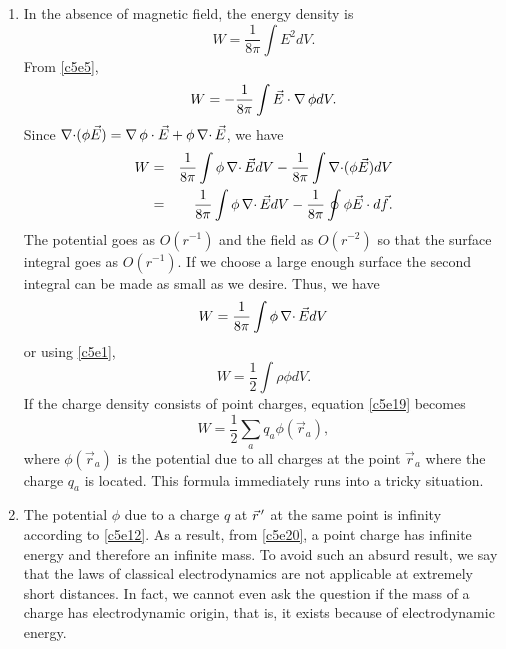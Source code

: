 \begin{enumerate}
\item In the absence of magnetic field, the energy density is
\begin{equation}\label{c5e18}
W = \frac{1}{8\pi}\int E^2dV.
\end{equation}
From \eqref{c5e5},
\[
W = -\frac{1}{8\pi}\int\vec{E}\cdot\operatorname{\nabla}\phi dV.
\]
Since $\operatorname{\nabla\cdot}(\phi\vec{E}) = \operatorname{\nabla}\phi\cdot\vec{E} + \phi\operatorname{\nabla\cdot}\vec{E}$, we have
\begin{eqnarray*}
W &=& 
\frac{1}{8\pi}\int\phi\operatorname{\nabla\cdot}\vec{E}dV - \frac{1}{8\pi}\int\operatorname{\nabla\cdot}(\phi\vec{E})dV \\
 &=& \frac{1}{8\pi}\int\phi\operatorname{\nabla\cdot}\vec{E}dV - 
 \frac{1}{8\pi}\oint \phi\vec{E}\cdot d\vec{f}.
\end{eqnarray*}
The potential goes as $O(r^{-1})$ and the field as $O(r^{-2})$ so that the 
surface integral goes as $O(r^{-1})$. If we choose a large enough surface the 
second integral can be made as small as we desire. Thus, we have
\[
W = \frac{1}{8\pi}\int\phi\operatorname{\nabla\cdot}\vec{E}dV
\]
or using \eqref{c5e1},
\begin{equation}\label{c5e19}
W = \frac{1}{2}\int\rho\phi dV.
\end{equation}
If the charge density consists of point charges, equation \eqref{c5e19} becomes
\begin{equation}\label{c5e20}
W = \frac{1}{2}\sum_a q_a\phi(\vec{r}_a),
\end{equation}
where $\phi(\vec{r}_a)$ is the potential due to all charges at the point 
$\vec{r}_a$ where the charge $q_a$ is located. This formula immediately runs 
into a tricky situation.

\item The potential $\phi$ due to a charge $q$ at $\vec{r}^{\,\prime}$ at the same 
point is infinity according to \eqref{c5e12}. As a result, from \eqref{c5e20}, 
a point charge has infinite energy and therefore an infinite mass. To avoid 
such an absurd result, we say that the laws of classical electrodynamics are not
applicable at extremely short distances. In fact, we cannot even ask the 
question if the mass of a charge has electrodynamic origin, that is, it exists 
because of electrodynamic energy.


\end{enumerate}

